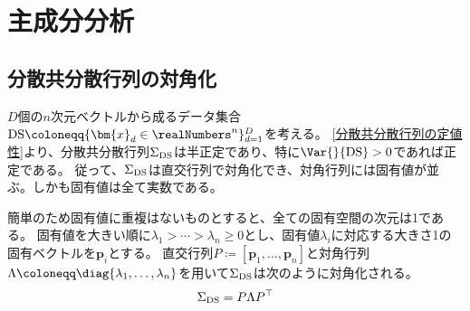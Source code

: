 \chapter{主成分分析}
    \section{分散共分散行列の対角化}
        $D$個の$n$次元ベクトルから成るデータ集合$\DS \coloneqq \{\bm{x}_d\in\realNumbers^n\}_{d=1}^D$を考える。
        \ref{分散共分散行列の定値性}より、分散共分散行列$\Sigma_{\textrm{DS}}$は半正定であり、特に$\Var{}{\DS}>0$であれば正定である。
        従って、$\Sigma_{\textrm{DS}}$は直交行列で対角化でき、対角行列には固有値が並ぶ。しかも固有値は全て実数である。
        \par
        簡単のため固有値に重複はないものとすると、全ての固有空間の次元は1である。
        固有値を大きい順に$\lambda_1>\dotsb>\lambda_n\geq 0$とし、固有値$\lambda_i$に対応する大きさ1の固有ベクトルを$\bm{p}_i$とする。
        直交行列$P\coloneqq[\bm{p}_1,\dotsc,\bm{p}_n]$と対角行列$\Lambda\coloneqq\diag{\lambda_1,\dotsc,\lambda_n}$を用いて$\Sigma_{\textrm{DS}}$は次のように対角化される。
        \[\Sigma_{\textrm{DS}} = P\Lambda P^\top\]
